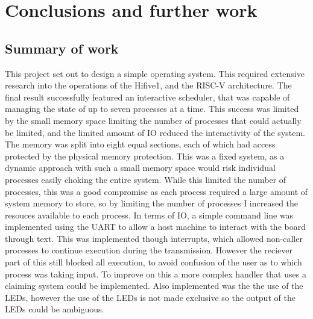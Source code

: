 \chapter[Conclusions and further work]{Conclusions and further work}
\label{cha:conc}
\section{Summary of work}
This project set out to design a simple operating system. This required extensive research into the operations of the Hifive1, and the RISC-V architecture. The final result successfully featured an interactive scheduler, that was capable of managing the state of up to seven processes at a time. This success was limited by the small memory space limiting the number of processes that could actually be limited, and the limited amount of IO reduced the interactivity of the system. The memory was split into eight equal sections, each of which had access protected by the physical memory protection. This was a fixed system, as a dynamic approach with such a small memory space would risk individual processes easily choking the entire system. While this limited the number of processes, this was a good compromise as each process required a large amount of system memory to store, so by limiting the number of processes I increased the resouces available to each process. In terms of IO, a simple command line was implemented using the UART to allow a host machine to interact with the board through text. This was implemented though interrupts, which allowed non-caller processes to continue execution during the transmission. However the reciever part of this still blocked all execution, to avoid confusion of the user as to which process was taking input. To improve on this a more complex handler that uses a claiming system could be implemented. Also implemented was the the use of the LEDs, however the use of the LEDs is not made exclusive so the output of the LEDs could be ambiguous.

